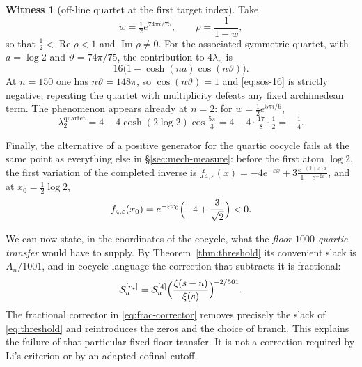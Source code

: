 \documentclass[11pt]{amsart}
\theoremstyle{definition}
\theoremstyle{remark}
\theoremstyle{definition}
\newtheorem{witness}{Witness}[section]
\renewcommand{\Re}{\operatorname{Re}}
\renewcommand{\Im}{\operatorname{Im}}
\newcommand{\half}{\tfrac{1}{2}}
\newcommand{\eps}{\varepsilon}
\begin{document}
\begin{witness}[off-line quartet at the first target index]\label{wit:sos-offline}
Take
\begin{equation}\label{eq:sos-w}
   w=\tfrac12e^{74\pi i/75},\qquad \rho=\frac{1}{1-w},
\end{equation}
so that $\half<\Re\rho<1$ and $\Im\rho\ne0$. For the associated symmetric quartet, with
$a=\log2$ and $\vartheta=74\pi/75$, the contribution to $4\lambda_n$ is
\begin{equation}\label{eq:sos-16}
   16\bigl(1-\cosh(na)\cos(n\vartheta)\bigr).
\end{equation}
At $n=150$ one has $n\vartheta=148\pi$, so $\cos(n\vartheta)=1$ and \eqref{eq:sos-16} is strictly
negative; repeating the quartet with multiplicity defeats any fixed archimedean term. The
phenomenon appears already at $n=2$: for $w=\tfrac12e^{5\pi i/6}$,
\begin{equation}\label{eq:sos-n2}
   \lambda_2^{\mathrm{quartet}}
   =4-4\cosh(2\log2)\cos\tfrac{5\pi}{3}
   =4-4\cdot\tfrac{17}{8}\cdot\tfrac12=-\tfrac14 .
\end{equation}
\end{witness}

\noindent Finally, the alternative of a positive generator for the quartic cocycle fails at the
same point as everything else in \S\ref{sec:mech-measure}: before the first atom $\log2$, the
first variation of the completed inverse is
$f_{4,\eps}(x)=-4e^{-\eps x}+3\tfrac{e^{-(3+\eps)x}}{1-e^{-2x}}$, and at $x_0=\tfrac12\log2$,
\begin{equation}\label{eq:sos-halflog2}
   f_{4,\eps}(x_0)=e^{-\eps x_0}\Bigl(-4+\frac{3}{\sqrt2}\Bigr)<0 .
\end{equation}

We can now state, in the coordinates of the cocycle, what the \emph{floor-$1000$ quartic
transfer} would have to supply. By Theorem~\ref{thm:threshold} its convenient slack is
$A_n/1001$, and in cocycle language the correction that subtracts it is fractional:
\begin{equation}\label{eq:frac-corrector}
   \mathcal S_u^{[r_*]}
   =\mathcal S_u^{[4]}\Bigl(\frac{\xi(s-u)}{\xi(s)}\Bigr)^{\!-2/501} .
\end{equation}
The fractional corrector in \eqref{eq:frac-corrector} removes precisely the slack of
\eqref{eq:threshold} and reintroduces the zeros and the choice of branch. This explains the failure of that
particular fixed-floor transfer. It is not a correction required by Li's criterion or by an
adapted cofinal cutoff.
\end{document}
